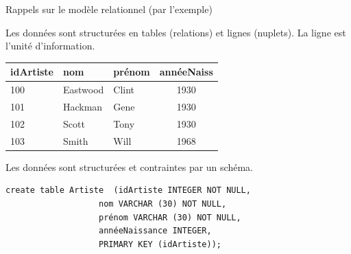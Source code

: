 \begin{frame}[fragile]{Rappels sur le modèle relationnel (par l'exemple)}

Les données sont structurées en \alert{tables} (relations) et \alert{lignes} (nuplets). 
La ligne est l'unité d'information.

\vfill

\begin{small}
\begin{tabular}{l|l|l|c}
\textbf{idArtiste} &  nom & prénom &  annéeNaiss \\
\hline
100 & Eastwood & Clint  & 1930 \\
101 & Hackman & Gene  & 1930 \\
102 & Scott & Tony  & 1930 \\
103 & Smith  & Will  & 1968 \\
\hline
\end{tabular}
\end{small}

\vfill
Les données sont structurées et contraintes par un \alert{schéma}.

\vfill

\begin{verbatim}
create table Artiste  (idArtiste INTEGER NOT NULL,
                   nom VARCHAR (30) NOT NULL,
                   prénom VARCHAR (30) NOT NULL,
                   annéeNaissance INTEGER,
                   PRIMARY KEY (idArtiste));
\end{verbatim}

\end{frame}


